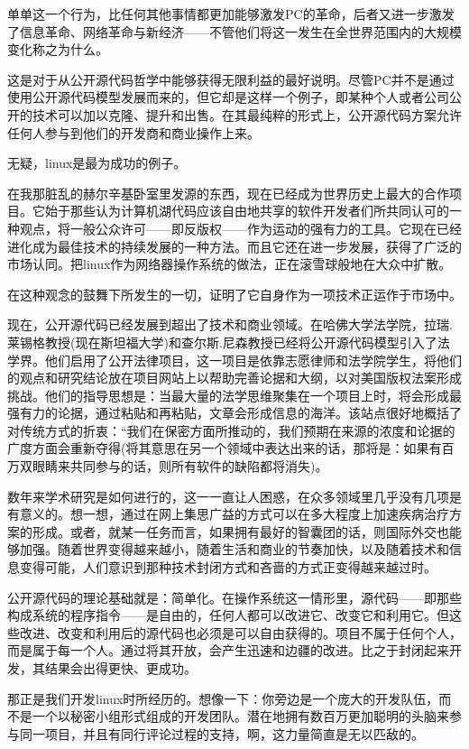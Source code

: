 单单这一个行为，比任何其他事情都更加能够激发PC的革命，后者又进一步激发了信息革命、网络革命与新经济——不管他们将这一发生在全世界范围内的大规模变化称之为什么。

这是对于从公开源代码哲学中能够获得无限利益的最好说明。尽管PC并不是通过使用公开源代码模型发展而来的，但它却是这样一个例子，即某种个人或者公司公开的技术可以加以克隆、提升和出售。在其最纯粹的形式上，公开源代码方案允许任何人参与到他们的开发商和商业操作上来。

无疑，linux是最为成功的例子。

在我那脏乱的赫尔辛基卧室里发源的东西，现在已经成为世界历史上最大的合作项目。它始于那些认为计算机湖代码应该自由地共享的软件开发者们所共同认可的一种观点，将一般公众许可——即反版权——作为运动的强有力的工具。它现在已经进化成为最佳技术的持续发展的一种方法。而且它还在进一步发展，获得了广泛的市场认同。把linux作为网络器操作系统的做法，正在滚雪球般地在大众中扩散。

在这种观念的鼓舞下所发生的一切，证明了它自身作为一项技术正运作于市场中。

现在，公开源代码已经发展到超出了技术和商业领域。在哈佛大学法学院，拉瑞.莱锡格教授(现在斯坦福大学)和查尔斯.尼森教授已经将公开源代码模型引入了法学界。他们启用了公开法律项目，这一项目是依靠志愿律师和法学院学生，将他们的观点和研究结论放在项目网站上以帮助完善论据和大纲，以对美国版权法案形成挑战。他们的指导思想是：当最大量的法学思维聚集在一个项目上时，将会形成最强有力的论据，通过粘贴和再粘贴，文章会形成信息的海洋。该站点很好地概括了对传统方式的折衷：“我们在保密方面所推动的，我们预期在来源的浓度和论据的广度方面会重新夺得(将其意思在另一个领域中表达出来的话，那将是：如果有百万双眼睛来共同参与的话，则所有软件的缺陷都将消失)。

数年来学术研究是如何进行的，这一一直让人困惑，在众多领域里几乎没有几项是有意义的。想一想，通过在网上集思广益的方式可以在多大程度上加速疾病治疗方案的形成。或者，就某一任务而言，如果拥有最好的智囊团的话，则国际外交也能够加强。随着世界变得越来越小，随着生活和商业的节奏加快，以及随着技术和信息变得可能，人们意识到那种技术封闭方式和吝啬的方式正变得越来越过时。

公开源代码的理论基础就是：简单化。在操作系统这一情形里，源代码——即那些构成系统的程序指令——是自由的，任何人都可以改进它、改变它和利用它。但这些改进、改变和利用后的源代码也必须是可以自由获得的。项目不属于任何个人，而是属于每一个人。通过将其开放，会产生迅速和边疆的改进。比之于封闭起来开发，其结果会出得更快、更成功。

那正是我们开发linux时所经历的。想像一下：你旁边是一个庞大的开发队伍，而不是一个以秘密小组形式组成的开发团队。潜在地拥有数百万更加聪明的头脑来参与同一项目，并且有同行评论过程的支持，啊，这力量简直是无以匹敌的。

